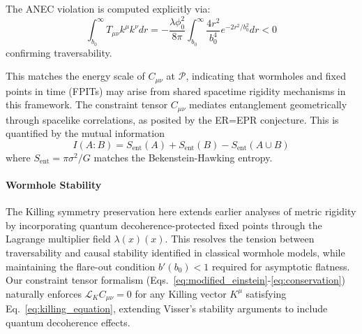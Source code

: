 \documentclass[twocolumn]{article}
\newcommand{\fpit}{\mathcal{P}}
\newcommand{\lagrange}{\lambda(x)}
\begin{document}
	The ANEC violation is computed explicitly via:  
	\begin{equation}
		\int_{b_0}^\infty T_{\mu\nu}k^\mu k^\nu dr = -\frac{\lambda \phi_0^2}{8\pi} \int_{b_0}^\infty \frac{4r^2}{b_0^4} e^{-2r^2/b_0^2} dr < 0
	\end{equation}
	confirming traversability\cite{visser1995}.  
	
	This matches the energy scale of \(C_{\mu\nu}\) at \(\fpit\), indicating that wormholes and fixed points in time (FPITs) may arise from shared spacetime rigidity mechanisms in this framework. The constraint tensor $C_{\mu\nu}$ mediates entanglement geometrically through spacelike correlations, as posited by the ER=EPR conjecture\cite{Maldacena2013}. This is quantified by the mutual information  
	\begin{equation}
		I(A:B) = S_{\text{ent}}(A) + S_{\text{ent}}(B) - S_{\text{ent}}(A \cup B)
	\end{equation}
	where $S_{\text{ent}} = \pi\sigma^2/G$ matches the Bekenstein-Hawking entropy\cite{bekenstein1973}.  
	
	\paragraph{Wormhole Stability}
	The Killing symmetry preservation here extends earlier analyses of metric rigidity\cite{visser1996} by incorporating quantum decoherence-protected fixed points through the Lagrange multiplier field $\lagrange(x)$. This resolves the tension between traversability and causal stability identified in classical wormhole models\cite{friedman1993}, while maintaining the flare-out condition $b'(b_0) < 1$ required for asymptotic flatness. Our constraint tensor formalism (Eqs.~\ref{eq:modified_einstein}-\ref{eq:conservation}) naturally enforces $\mathcal{L}_K C_{\mu\nu} = 0$ for any Killing vector $K^\mu$ satisfying Eq.~\ref{eq:killing_equation}, extending Visser’s stability arguments\cite{visser1996} to include quantum decoherence effects.  
	
\end{document}

